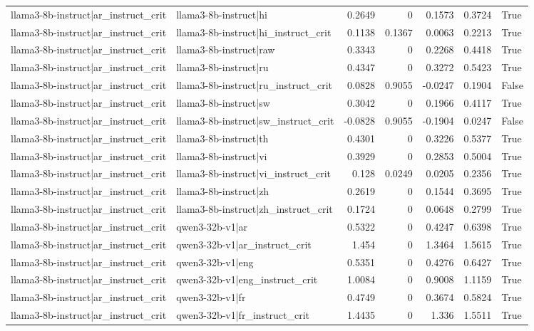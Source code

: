 \begin{table}
\begin{tabular}{l l r r r r l}
llama3-8b-instruct|ar_instruct_crit & llama3-8b-instruct|hi & 0.2649 & 0 & 0.1573 & 0.3724 & True \\
llama3-8b-instruct|ar_instruct_crit & llama3-8b-instruct|hi_instruct_crit & 0.1138 & 0.1367 & 0.0063 & 0.2213 & True \\
llama3-8b-instruct|ar_instruct_crit & llama3-8b-instruct|raw & 0.3343 & 0 & 0.2268 & 0.4418 & True \\
llama3-8b-instruct|ar_instruct_crit & llama3-8b-instruct|ru & 0.4347 & 0 & 0.3272 & 0.5423 & True \\
llama3-8b-instruct|ar_instruct_crit & llama3-8b-instruct|ru_instruct_crit & 0.0828 & 0.9055 & -0.0247 & 0.1904 & False \\
llama3-8b-instruct|ar_instruct_crit & llama3-8b-instruct|sw & 0.3042 & 0 & 0.1966 & 0.4117 & True \\
llama3-8b-instruct|ar_instruct_crit & llama3-8b-instruct|sw_instruct_crit & -0.0828 & 0.9055 & -0.1904 & 0.0247 & False \\
llama3-8b-instruct|ar_instruct_crit & llama3-8b-instruct|th & 0.4301 & 0 & 0.3226 & 0.5377 & True \\
llama3-8b-instruct|ar_instruct_crit & llama3-8b-instruct|vi & 0.3929 & 0 & 0.2853 & 0.5004 & True \\
llama3-8b-instruct|ar_instruct_crit & llama3-8b-instruct|vi_instruct_crit & 0.128 & 0.0249 & 0.0205 & 0.2356 & True \\
llama3-8b-instruct|ar_instruct_crit & llama3-8b-instruct|zh & 0.2619 & 0 & 0.1544 & 0.3695 & True \\
llama3-8b-instruct|ar_instruct_crit & llama3-8b-instruct|zh_instruct_crit & 0.1724 & 0 & 0.0648 & 0.2799 & True \\
llama3-8b-instruct|ar_instruct_crit & qwen3-32b-v1|ar & 0.5322 & 0 & 0.4247 & 0.6398 & True \\
llama3-8b-instruct|ar_instruct_crit & qwen3-32b-v1|ar_instruct_crit & 1.454 & 0 & 1.3464 & 1.5615 & True \\
llama3-8b-instruct|ar_instruct_crit & qwen3-32b-v1|eng & 0.5351 & 0 & 0.4276 & 0.6427 & True \\
llama3-8b-instruct|ar_instruct_crit & qwen3-32b-v1|eng_instruct_crit & 1.0084 & 0 & 0.9008 & 1.1159 & True \\
llama3-8b-instruct|ar_instruct_crit & qwen3-32b-v1|fr & 0.4749 & 0 & 0.3674 & 0.5824 & True \\
llama3-8b-instruct|ar_instruct_crit & qwen3-32b-v1|fr_instruct_crit & 1.4435 & 0 & 1.336 & 1.5511 & True \\

\end{tabular}
\end{table}

